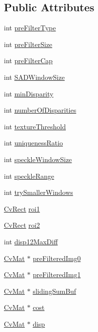 \subsection*{Public Attributes}
\begin{DoxyCompactItemize}
\item 
int \hyperlink{structCvStereoBMState_a40b1a3461c20acc310cb92d717d80349}{pre\-Filter\-Type}
\item 
int \hyperlink{structCvStereoBMState_a285cf901700e024d349357e24eb56f5f}{pre\-Filter\-Size}
\item 
int \hyperlink{structCvStereoBMState_a97497d8743ca96035a0342c124ba5722}{pre\-Filter\-Cap}
\item 
int \hyperlink{structCvStereoBMState_a4a9afba8bb5776a39272f6e1572b9287}{S\-A\-D\-Window\-Size}
\item 
int \hyperlink{structCvStereoBMState_a6e8adbd6b4c605a97319e95ccc1574dd}{min\-Disparity}
\item 
int \hyperlink{structCvStereoBMState_ad9309c0a1d86ada87dc992adaf778f8f}{number\-Of\-Disparities}
\item 
int \hyperlink{structCvStereoBMState_af343293b2b824cc268224f27a5865251}{texture\-Threshold}
\item 
int \hyperlink{structCvStereoBMState_a6e34951a7f217bcdea3eadfb21197771}{uniqueness\-Ratio}
\item 
int \hyperlink{structCvStereoBMState_a2c5539336775ae6521a050441a2a547a}{speckle\-Window\-Size}
\item 
int \hyperlink{structCvStereoBMState_a65c679c2e73aca45135f5230eb264f4d}{speckle\-Range}
\item 
int \hyperlink{structCvStereoBMState_a00d06afb9609f107340d970c936571d9}{try\-Smaller\-Windows}
\item 
\hyperlink{structCvRect}{Cv\-Rect} \hyperlink{structCvStereoBMState_a65ba70be5d89b6fe99e8c93545f7e3e3}{roi1}
\item 
\hyperlink{structCvRect}{Cv\-Rect} \hyperlink{structCvStereoBMState_a7b734590f1df73fcb2eef9197ab02ba2}{roi2}
\item 
int \hyperlink{structCvStereoBMState_a4d518dac5f8237ac304a8295d4640cc6}{disp12\-Max\-Diff}
\item 
\hyperlink{structCvMat}{Cv\-Mat} $\ast$ \hyperlink{structCvStereoBMState_a2f133a2c8eb9de753d957a23784f26dd}{pre\-Filtered\-Img0}
\item 
\hyperlink{structCvMat}{Cv\-Mat} $\ast$ \hyperlink{structCvStereoBMState_a71ec729ddd63b97da67d985f5d56c5f3}{pre\-Filtered\-Img1}
\item 
\hyperlink{structCvMat}{Cv\-Mat} $\ast$ \hyperlink{structCvStereoBMState_af07848cf3acc7faa9976ccd4a1ed5954}{sliding\-Sum\-Buf}
\item 
\hyperlink{structCvMat}{Cv\-Mat} $\ast$ \hyperlink{structCvStereoBMState_aa9076a33fdfb9d78ba9d27b717eadd0c}{cost}
\item 
\hyperlink{structCvMat}{Cv\-Mat} $\ast$ \hyperlink{structCvStereoBMState_a44ac348e202fd808345395fde2b5b58a}{disp}
\end{DoxyCompactItemize}


